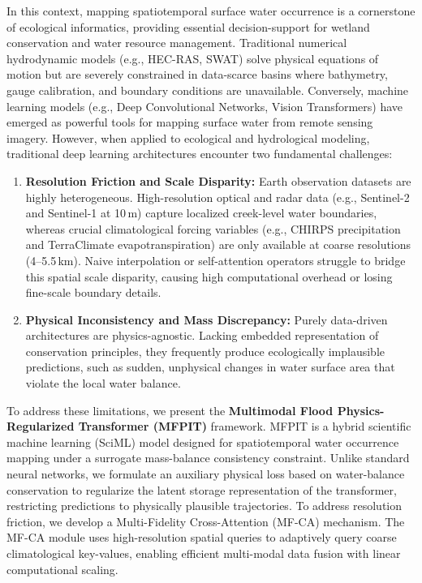 \documentclass[preprint,12pt]{elsarticle}
\begin{document}
In this context, mapping spatiotemporal surface water occurrence is a cornerstone of ecological informatics, providing essential decision-support for wetland conservation and water resource management. Traditional numerical hydrodynamic models (e.g., HEC-RAS, SWAT) solve physical equations of motion but are severely constrained in data-scarce basins where bathymetry, gauge calibration, and boundary conditions are unavailable. Conversely, machine learning models (e.g., Deep Convolutional Networks, Vision Transformers) have emerged as powerful tools for mapping surface water from remote sensing imagery. However, when applied to ecological and hydrological modeling, traditional deep learning architectures encounter two fundamental challenges:
\begin{enumerate}
    \item \textbf{Resolution Friction and Scale Disparity:} Earth observation datasets are highly heterogeneous. High-resolution optical and radar data (e.g., Sentinel-2 and Sentinel-1 at 10\,m) capture localized creek-level water boundaries, whereas crucial climatological forcing variables (e.g., CHIRPS precipitation and TerraClimate evapotranspiration) are only available at coarse resolutions (4--5.5\,km). Naive interpolation or self-attention operators struggle to bridge this spatial scale disparity, causing high computational overhead or losing fine-scale boundary details.
    \item \textbf{Physical Inconsistency and Mass Discrepancy:} Purely data-driven architectures are physics-agnostic. Lacking embedded representation of conservation principles, they frequently produce ecologically implausible predictions, such as sudden, unphysical changes in water surface area that violate the local water balance.
\end{enumerate}

To address these limitations, we present the \textbf{Multimodal Flood Physics-Regularized Transformer (MFPIT)} framework. MFPIT is a hybrid scientific machine learning (SciML) model designed for spatiotemporal water occurrence mapping under a surrogate mass-balance consistency constraint. Unlike standard neural networks, we formulate an auxiliary physical loss based on water-balance conservation to regularize the latent storage representation of the transformer, restricting predictions to physically plausible trajectories. To address resolution friction, we develop a Multi-Fidelity Cross-Attention (MF-CA) mechanism. The MF-CA module uses high-resolution spatial queries to adaptively query coarse climatological key-values, enabling efficient multi-modal data fusion with linear computational scaling.
\end{document}
